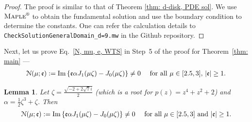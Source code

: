 \documentclass[11pt,a4paper,english,reqno]{amsart}
\theoremstyle{plain}
\newtheorem{lemma}[definition]{Lemma}
\newcommand{\1}{\mathbbm{1}}
\begin{document}
\begin{proof}
The proof is similar to that of Theorem \ref{thm: d-disk, PDE sol}. We use $\textsc{Maple}^\text{\textregistered}$ to obtain the fundamental solution and use the boundary condition to determine the constants. One can refer the calculation details to \texttt{CheckSolutionGeneralDomain\_d=9.mw} in the Github repository. 
\end{proof}


Next, let us prove Eq.~\eqref{N, mu, e, WTS} in Step~5 of the proof for Theorem~\ref{thm: main} ---
\begin{align*}
\mathcal{N}(\mu;\mathfrak{e}) := {\rm Im}\left\{ \mathfrak{e} \alpha J_1(\mu\zeta) - J_0(\mu\zeta) \right\} \neq 0\quad\text{ for all } \mu \in [2.5,3],\,
|\mathfrak{e}|\geq 1.
\end{align*}



\begin{lemma}\label{lem: appendix}
Let $\zeta = \frac{\sqrt{-2+2\sqrt{7}i}}{2}$ (which is a root for $p(z) = z^{4} + z^2 +2$) and $\alpha = \frac{1}{2}\zeta^{3} + \zeta$. Then
\begin{equation*}\mathcal{N}(\mu;\mathfrak{e}) := {\rm Im}\left\{ \mathfrak{e} \alpha J_1(\mu\zeta) - J_0(\mu\zeta) \right\} \neq 0\quad\text{ for all } \mu \in [2.5,3] \text{ and } |\mathfrak{e}|\geq 1.
\end{equation*}
\end{lemma}
\end{document}
